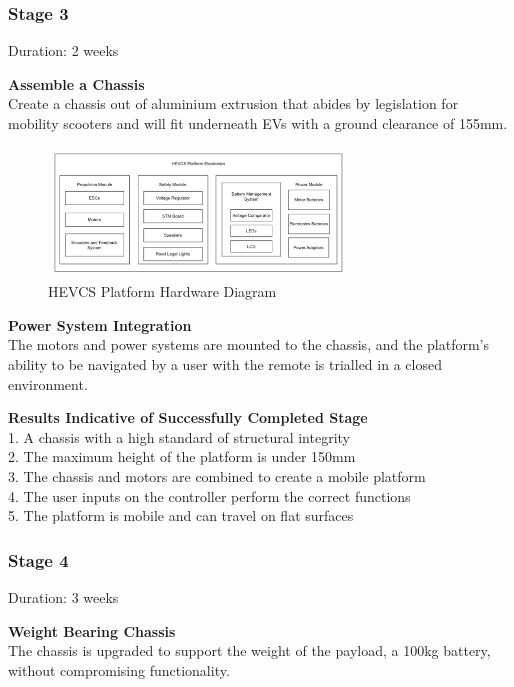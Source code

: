 \documentclass [12pt]{article}
\begin{document}
\subsubsection{Stage 3}

Duration: 2 weeks

\textbf{Assemble a Chassis}\\
Create a chassis out of aluminium extrusion that abides by legislation for mobility scooters and will fit underneath EVs with a ground clearance of 155mm.

\begin{figure}[h]
    \centering
    \includegraphics[width = 8cm]{PlatformHardware.png}
    \caption{HEVCS Platform Hardware Diagram}
\end{figure}

\textbf{Power System Integration}\\
The motors and power systems are mounted to the chassis, and the platform’s ability to be navigated by a user with the remote is trialled in a closed environment.

\textbf{Results Indicative of Successfully Completed Stage}\\
1.	A chassis with a high standard of structural integrity \\
2.	The maximum height of the platform is under 150mm\\
3.	The chassis and motors are combined to create a mobile platform\\
4.	The user inputs on the controller perform the correct functions\\
5.	The platform is mobile and can travel on flat surfaces\\

\subsubsection{Stage 4}
Duration: 3 weeks

\textbf{Weight Bearing Chassis}\\
The chassis is upgraded to support the weight of the payload, a 100kg battery, without compromising functionality.
\end{document}
